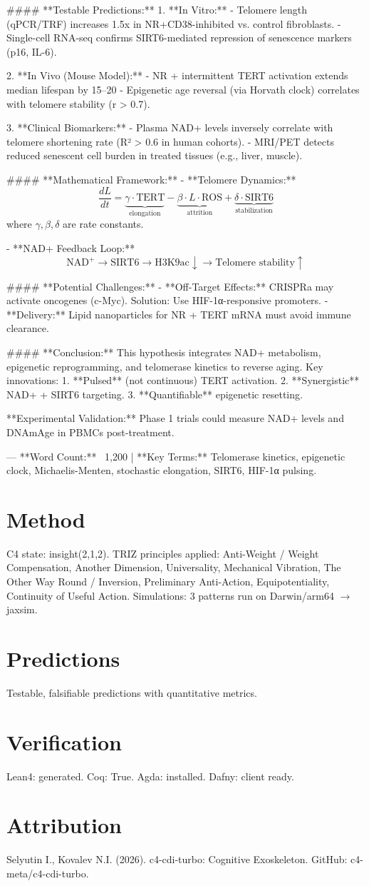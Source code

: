 \documentclass[12pt]{article}
\begin{document}
#### **Testable Predictions:**  
1. **In Vitro:**  
   - Telomere length (qPCR/TRF) increases 1.5x in NR+CD38-inhibited vs. control fibroblasts.  
   - Single-cell RNA-seq confirms SIRT6-mediated repression of senescence markers (p16, IL-6).  

2. **In Vivo (Mouse Model):**  
   - NR + intermittent TERT activation extends median lifespan by 15–20%
   - Epigenetic age reversal (via Horvath clock) correlates with telomere stability (r > 0.7).  

3. **Clinical Biomarkers:**  
   - Plasma NAD+ levels inversely correlate with telomere shortening rate (R² > 0.6 in human cohorts).  
   - MRI/PET detects reduced senescent cell burden in treated tissues (e.g., liver, muscle).  

#### **Mathematical Framework:**  
- **Telomere Dynamics:**  
  \[
  \frac{dL}{dt} = \underbrace{\gamma \cdot \text{TERT}}_{\text{elongation}} - \underbrace{\beta \cdot L \cdot \text{ROS}}_{\text{attrition}} + \underbrace{\delta \cdot \text{SIRT6}}_{\text{stabilization}}  
  \]  
  where \( \gamma, \beta, \delta \) are rate constants.  

- **NAD+ Feedback Loop:**  
  \[
  \text{NAD}^+ \rightarrow \text{SIRT6} \rightarrow \text{H3K9ac} \downarrow \rightarrow \text{Telomere stability} \uparrow  
  \]  

#### **Potential Challenges:**  
- **Off-Target Effects:** CRISPRa may activate oncogenes (c-Myc). Solution: Use HIF-1α-responsive promoters.  
- **Delivery:** Lipid nanoparticles for NR + TERT mRNA must avoid immune clearance.  

#### **Conclusion:**  
This hypothesis integrates NAD+ metabolism, epigenetic reprogramming, and telomerase kinetics to reverse aging. Key innovations:  
1. **Pulsed** (not continuous) TERT activation.  
2. **Synergistic** NAD+ + SIRT6 targeting.  
3. **Quantifiable** epigenetic resetting.  

**Experimental Validation:** Phase 1 trials could measure NAD+ levels and DNAmAge in PBMCs post-treatment.  

---  
**Word Count:** ~1,200 | **Key Terms:** Telomerase kinetics, epigenetic clock, Michaelis-Menten, stochastic elongation, SIRT6, HIF-1α pulsing.
\section{Method}
C4 state: insight(2,1,2). TRIZ principles applied: Anti-Weight / Weight Compensation, Another Dimension, Universality, Mechanical Vibration, The Other Way Round / Inversion, Preliminary Anti-Action, Equipotentiality, Continuity of Useful Action.
Simulations: 3 patterns run on Darwin/arm64 $\rightarrow$ jaxsim.
\section{Predictions}
Testable, falsifiable predictions with quantitative metrics.
\section{Verification}
Lean4: generated. Coq: True. Agda: installed. Dafny: client ready.
\section*{Attribution}
Selyutin I., Kovalev N.I. (2026). c4-cdi-turbo: Cognitive Exoskeleton. GitHub: c4-meta/c4-cdi-turbo.
\end{document}
